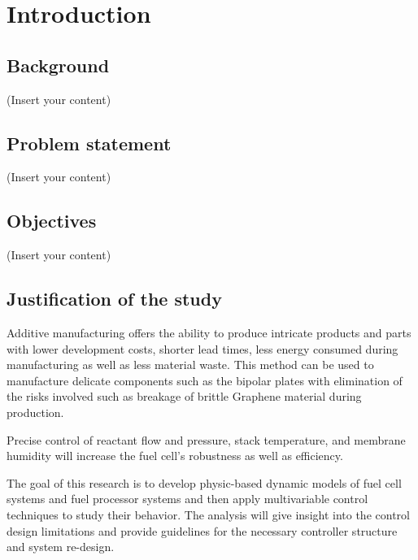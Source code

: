 \section{Introduction}
\subsection{Background}
(Insert your content)
\subsection{Problem statement}
(Insert your content)
\subsection{Objectives}
(Insert your content)
\subsection{Justification of the study}
Additive manufacturing offers the ability to produce intricate products and parts with lower development costs, shorter lead times, less energy consumed during manufacturing as well as less material waste. This method can be used to manufacture delicate components such as the bipolar plates with elimination of the risks involved such as breakage of brittle Graphene material during production.     

Precise control of reactant flow and pressure, stack temperature, and membrane humidity will increase the fuel cell’s robustness as well as efficiency.

The goal of this research is to develop physic-based dynamic models of fuel cell systems and fuel processor systems and then apply multivariable control techniques to study their behavior. The analysis will give insight into the control design limitations and provide guidelines for the necessary controller structure and system re-design.

